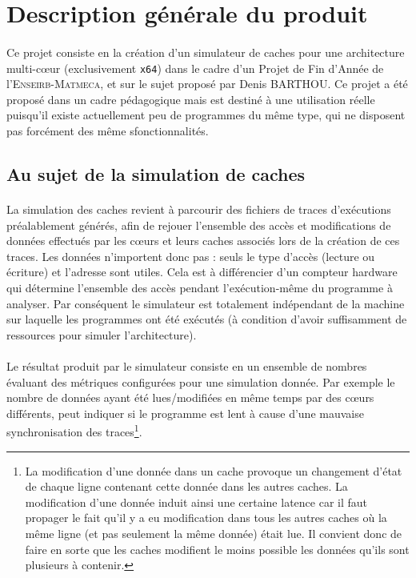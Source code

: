 \section{Description générale du produit}

\paragraph{}
Ce projet consiste en la création d'un simulateur de caches pour une architecture multi-c\oe ur (exclusivement \verb!x64!) dans le cadre d'un Projet de Fin d'Année de l'\textsc{Enseirb-Matmeca}, et sur le sujet proposé par Denis BARTHOU. Ce projet a été proposé dans un cadre pédagogique mais est destiné à une utilisation réelle puisqu'il existe actuellement peu de programmes du même type, qui ne disposent pas forcément des même sfonctionnalités.

\subsection{Au sujet de la simulation de caches}

\paragraph{}
La simulation des caches revient à parcourir des fichiers de traces d'exécutions préalablement générés, afin de rejouer l'ensemble des accès et modifications de données effectués par les c\oe urs et leurs caches associés lors de la création de ces traces. Les données n'importent donc pas : seuls le type d'accès (lecture ou écriture) et l'adresse sont utiles. Cela est à différencier d'un compteur hardware qui détermine l'ensemble des accès pendant l'exécution-même du programme à analyser. Par conséquent le simulateur est totalement indépendant de la machine sur laquelle les programmes ont été exécutés (à condition d'avoir suffisamment de ressources pour simuler l'architecture).   

\paragraph{}
Le résultat produit par le simulateur consiste en un ensemble de nombres évaluant des métriques configurées pour une simulation donnée. Par exemple le nombre de données ayant été lues/modifiées en même temps par des c\oe urs différents, peut indiquer si le programme est lent à cause d'une mauvaise synchronisation des traces\footnote{La modification d'une donnée dans un cache provoque un changement d'état de chaque ligne contenant cette donnée dans les autres caches. La modification d'une donnée induit ainsi une certaine latence car il faut propager le fait qu'il y a eu modification dans tous les autres caches où la même ligne (et pas seulement la même donnée) était lue. Il convient donc de faire en sorte que les caches modifient le moins possible les données qu'ils sont plusieurs à contenir.}.

